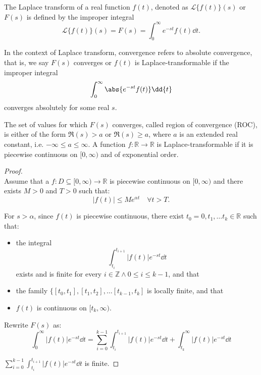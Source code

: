 \documentclass[a4paper,12pt]{report}
\begin{document}
\begin{itemize}
\begin{itemize}
The Laplace transform of a real function $f(t)$, denoted as $\mathcal{L}\{f(t)\}(s)$ or $F(s)$ is defined by the improper integral
\[\mathcal{L}\{f(t)\}(s) = F(s) = \int_0^{\infty} e^{-st} f(t)\dd{t}.\]

In the context of Laplace transform, convergence refers to absolute convergence, that is, we say $F(s)$ converges or $f(t)$ is Laplace-transformable if the improper integral
\[\int_0^{\infty} \abs{e^{-st} f(t)}\dd{t}\]
converges absolutely for some real $s$.

The set of values for which $F(s)$ converges, called region of convergence (ROC), is either of the form $\Re(s) > a$ or $\Re(s) \geq a$, where $a$ is an extended real constant, i.e. $-\infty\leq a\leq\infty$.
A function $f\colon\mathbb{R}\to\mathbb{R}$ is Laplace-transformable if it is piecewise continuous on $[0,\infty)$ and of exponential order.
\begin{proof}\mbox{}\\
Assume that a $f\colon D\subseteq [0,\infty)\to\mathbb{R}$ is piecewise continuous on $[0,\infty)$ and there exists $M>0$ and $T>0$ such that:
\[|f(t)|\leq Me^{\alpha t}\quad \forall t>T.\]

For $s>\alpha$, since $f(t)$ is piecewise continuous, there exist $t_0=0,t_1,\dots t_k\in\mathbb{R}$ such that:
\begin{itemize}
\item the integral
\[\int_{t_i}^{t_{i+1}} |f(t)| e^{-st}\dd{t}\]
exists and is finite for every $i\in\mathbb{Z}\land 0\leq i\leq k-1$, and that
\item the family $\{[t_0,t_1],[t_1,t_2],\dots [t_{k-1},t_k]$ is locally finite, and that
\item $f(t)$ is continuous on $[t_k,\infty)$.
\end{itemize}

Rewrite $F(s)$ as:
\[\int_0^\infty |f(t)| e^{-st}\dd{t} = \sum_{i=0}^{k-1} \int_{t_i}^{t_{i+1}} |f(t)| e^{-st}\dd{t} + \int_{t_k}^\infty |f(t)| e^{-st}\dd{t}\]

$\sum_{i=0}^{k-1} \int_{t_i}^{t_{i+1}} |f(t)| e^{-st}\dd{t}$ is finite.


\end{proof}
\end{itemize}
\end{itemize}
\end{document}

